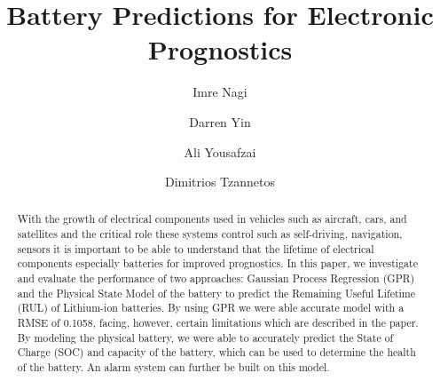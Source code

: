 \documentclass[sigconf]{acmart}
\newcommand{\lib}{Lithium-ion }
\begin{document}
\title{Battery Predictions for Electronic Prognostics}


 

\author{Imre Nagi}

\author{Darren Yin}

\author{Ali Yousafzai}

\author{Dimitrios Tzannetos}


\renewcommand\footnotetextcopyrightpermission[1]{} %
\pagestyle{plain}

\begin{abstract}
With the growth of electrical components used in vehicles such as aircraft, cars, and satellites and the critical role these systems control such as self-driving, navigation, sensors it is important to be able to understand that the lifetime of electrical components especially batteries for improved prognostics. In this paper, we investigate and evaluate the performance of two approaches: Gaussian Process Regression (GPR) and the Physical State Model of the battery to predict the Remaining Useful Lifetime (RUL) of \lib batteries. By using GPR we were able accurate model with a RMSE of 0.1058, facing, however, certain limitations which are described in the paper. By modeling the physical battery, we were able to accurately predict the State of Charge (SOC) and capacity of the battery, which can be used to determine the health of the battery. An alarm system can further be built on this model.

\end{abstract}

%
%






\maketitle




 
\end{document}
